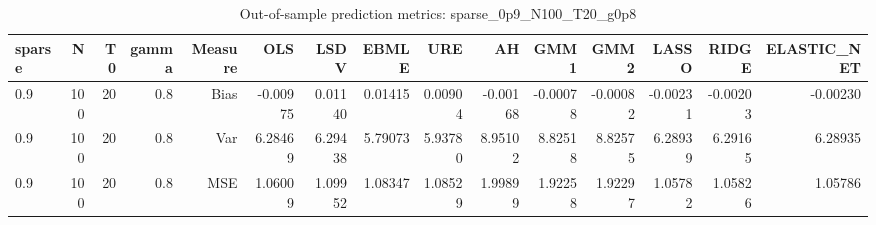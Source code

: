 \begin{table}[!htbp]\centering
\caption{Out-of-sample prediction metrics: sparse_0p9_N100_T20_g0p8}
\label{tab:table3_sparse_0p9_N100_T20_g0p8}
\begin{tabular}{lrrrrrrrrrrrrrr}
\hline
sparse & N & T0 & gamma & Measure & OLS & LSDV & EBMLE & URE & AH & GMM1 & GMM2 & LASSO & RIDGE & ELASTIC_NET \\
\hline
0.9 & 100 & 20 & 0.8 & Bias & -0.00975 & 0.01140 & 0.01415 & 0.00904 & -0.00168 & -0.00078 & -0.00082 & -0.00231 & -0.00203 & -0.00230 \\
0.9 & 100 & 20 & 0.8 & Var & 6.28469 & 6.29438 & 5.79073 & 5.93780 & 8.95102 & 8.82518 & 8.82575 & 6.28939 & 6.29165 & 6.28935 \\
0.9 & 100 & 20 & 0.8 & MSE & 1.06009 & 1.09952 & 1.08347 & 1.08529 & 1.99899 & 1.92258 & 1.92297 & 1.05782 & 1.05826 & 1.05786 \\
\hline
\end{tabular}
\end{table}

